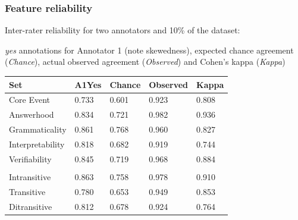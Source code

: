 \documentclass[xcolor={dvipsnames}]{beamer}
\begin{document}
\begin{frame}
\frametitle{Feature reliability}
\pause
Inter-rater reliability for two annotators and 10\% of the dataset:
\pause

\textit{yes} annotations for Annotator 1 (note skewedness), expected chance agreement (\textit{Chance}), actual observed agreement (\textit{Observed}) and Cohen's kappa (\textit{Kappa})

\begin{table}[htb!]
\begin{center}
\begin{tabular}{|l|l||l|l||l|}
\hline
Set	& A1Yes & Chance & Observed & Kappa \\
\hline
\hline
Core Event & 0.733 & 0.601 & 0.923 & 0.808 \\
\hline
Answerhood & 0.834 & 0.721 & 0.982 & 0.936 \\
\hline
Grammaticality & 0.861 & 0.768 & 0.960 & 0.827 \\
\hline
Interpretability & 0.818 & 0.682 & 0.919 & 0.744 \\
\hline
Verifiability & 0.845 & 0.719 & 0.968 & 0.884 \\
\hline
\pause \\
\hline
Intransitive & 0.863 & 0.758 & 0.978 & 0.910 \\
\hline
Transitive & 0.780 & 0.653 & 0.949 & 0.853 \\
\hline
Ditransitive & 0.812 & 0.678 & 0.924 & 0.764 \\ 
\hline
\end{tabular}
\end{center}
\end{table}
\end{frame}
\end{document}
